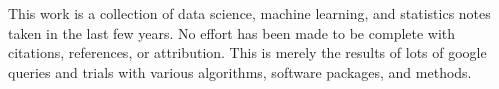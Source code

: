 \usepackage{booktabs}

This work is a collection of data science, machine learning, and statistics notes taken in the last few years. No effort has been made to be complete with citations, references, or attribution.  This is merely the results of lots of google queries and trials with various algorithms, software packages, and methods.  